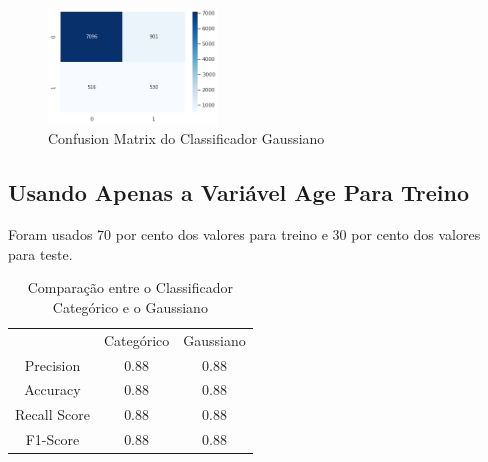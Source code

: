 \documentclass[conference]{IEEEtran}
\begin{document}
\begin{figure}[H]
\centerline{\includegraphics[width=0.4\textwidth]{IMGS/cm-gaussiano.png}}
\label{cm1-gnb}
\caption{\label{fig:cm1-gnb}Confusion Matrix do Classificador Gaussiano}
\end{figure}

\subsection{Usando Apenas a Variável Age Para Treino}
Foram usados 70 por cento dos valores para treino e 30 por cento dos valores para teste.

\begin{table}[H]
	\centering
    \caption{\label{tab:cr2-gt} Comparação entre o Classificador Categórico e o Gaussiano}
    \begin{small}
        \begin{tabular}{ccc}
        	\\
        	\\
            \hline
                                    & Categórico       & Gaussiano\\
            \hline
            Precision               & 0.88             & 0.88\\
            Accuracy                & 0.88             & 0.88\\
            Recall Score            & 0.88             & 0.88\\
            F1-Score                & 0.88             & 0.88\\
            
            \hline
        \end{tabular}
    \end{small}
\end{table}
\end{document}
